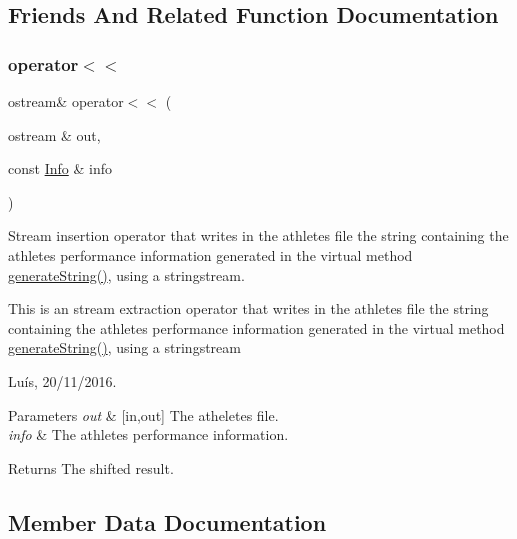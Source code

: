 \subsection{Friends And Related Function Documentation}
\hypertarget{class_info_afea35e873bef1ced055e4f0e3eee9838}{}\label{class_info_afea35e873bef1ced055e4f0e3eee9838} 
\subsubsection{\texorpdfstring{operator$<$$<$}{operator<<}}
{\footnotesize\ttfamily ostream\& operator$<$$<$ (\begin{DoxyParamCaption}\item[{ostream \&}]{out,  }\item[{const \hyperlink{class_info}{Info} \&}]{info }\end{DoxyParamCaption})\hspace{0.3cm}{\ttfamily [friend]}}



Stream insertion operator that writes in the athlete\textquotesingle{}s file the string containing the athlete\textquotesingle{}s performance information generated in the virtual method \hyperlink{class_info_a5e52b35a9c17b58222bb57af16c16ce3}{generate\+String()}, using a stringstream. 

This is an stream extraction operator that writes in the athlete\textquotesingle{}s file the string containing the athlete\textquotesingle{}s performance information generated in the virtual method \hyperlink{class_info_a5e52b35a9c17b58222bb57af16c16ce3}{generate\+String()}, using a stringstream

Luís, 20/11/2016. 


\begin{DoxyParams}{Parameters}
{\em out} & \mbox{[}in,out\mbox{]} The atheletes file. \\
\hline
{\em info} & The athlete\textquotesingle{}s performance information. \\
\hline
\end{DoxyParams}


\begin{DoxyReturn}{Returns}
The shifted result. 
\end{DoxyReturn}


\subsection{Member Data Documentation}
\hypertarget{class_info_a1c0340af11df3407946b0ffdaae28864}{}\label{class_info_a1c0340af11df3407946b0ffdaae28864} 
